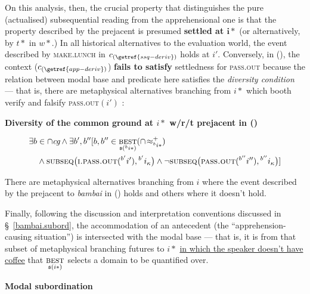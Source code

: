 On this analysis, then, the crucial property that distinguishes the pure (actualised) subsequential reading from the apprehensional one is that the property described by the prejacent is presumed \textbf{settled at $ \boldsymbol{i*}$} (or alternatively, by $ t* $ in $ w* $.) In all historical alternatives to the evaluation world, the event described by \textsc{make.lunch} in $ c_{(\getref{ssq-deriv})}$ holds at $ i' $. Conversely, in (), the context ($ c_{(\getref{app-deriv})} $) \textbf{fails to satisfy} settledness for \textsc{pass.out} because the relation between modal base and predicate here satisfies the \textit{diversity condition} --- that is, there are metaphysical alternatives branching from $ i* $ which booth verify and falsify \textsc{pass.out}$ (i') $ \citep[\textit{cf.}][83]{Condoravdi2002}:

\pex \textbf{Diversity of the common ground at $ i* $ w/r/t prejacent in ()}


$$ \begin{multlined}\exists b\in\cap\textit{cg}\wedge\exists b',b''[b,b''\in\underset{\mathfrak s(^bi*)}{\textsc{best}}(\cap\!\approx^+_{^bi*})\\\wedge\textsc{subseq}\big(\textsc{i.pass.out}(^{b'}i'),{}^{b'}i_\kappa\big)\wedge\neg\textsc{subseq}\big(\textsc{pass.out}(^{b''}i''),{}^{b''}i_\kappa\big)]\end{multlined}$$ 

There are metaphysical alternatives branching from $ i $ where the event described by the prejacent to \textit{bambai} in () holds and others where it doesn't hold.
\xe

\noindent Finally, following the discussion and interpretation conventions discussed in \S~\ref{bambai.subord}, the accommodation of an antecedent (the ``apprehension-causing situation'') is intersected with the modal base --- that is, it is from that subset of metaphysical branching futures to $ i* $ \ul{in which the speaker doesn't have coffee} that $ \underset{\mathfrak s(i*)}{\textsc{best}} $ selects a domain to be quantified over.%

\pex[exno=\getref{app-deriv}]\a[label=f]\textbf{Modal subordination}


